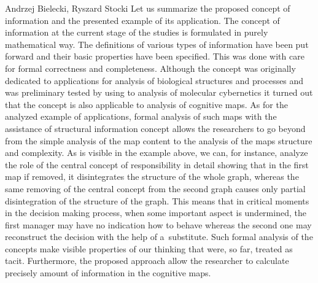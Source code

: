 \begin{artengenv2auth}{Andrzej Bielecki, Ryszard Stocki}
Let us summarize the proposed concept of information and the presented example of its application. The concept of information at the current stage of the studies is formulated in purely mathematical way. The definitions of various types of information have been put forward and their basic properties have been specified. This was done with care for formal correctness and completeness. Although the concept was originally dedicated to applications for analysis of biological structures and processes 
\parencite[see][]{bielecki_general_2015} %
 and was preliminary tested by using to analysis of molecular cybernetics 
\parencite[see][]{bielecki_information_2022} %
 it turned out that the concept is also applicable to analysis of cognitive maps. As for the analyzed example of applications, formal analysis of such maps with the assistance of structural information concept allows the researchers to go beyond from the simple analysis of the map content to the analysis of the maps structure and complexity. As is visible in the example above, we can, for instance, analyze the role of the central concept of responsibility in detail showing that in the first map if removed, it disintegrates the structure of the whole graph, whereas the same removing of the central concept from the second graph causes only partial disintegration of the structure of the graph. This means that in critical moments in the decision making process, when some important aspect is undermined, the first manager may have no indication how to behave whereas the second one may reconstruct the decision with the help of a~substitute. Such formal analysis of the concepts make visible properties of our thinking that were, so far, treated as tacit. Furthermore, the proposed approach allow the researcher to calculate precisely amount of information in the cognitive maps.



\end{artengenv2auth}

